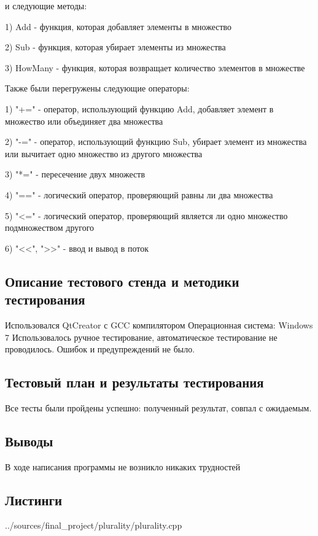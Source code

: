 \documentclass[12pt,a4paper]{report}
\begin{document}
и следующие методы:
\item[1)] Add - функция, которая добавляет элементы в множество
\item[2)] Sub - функция, которая убирает элементы из множества
\item[3)] HowMany - функция, которая возвращает количество элементов в множестве

Также были перегружены следующие операторы:
\item[1)] "+=" - оператор, использующий функцию Add, добавляет элемент в множество или объединяет два множества
\item[2)] "-=" - оператор, использующий функцию Sub, убирает элемент из множества или вычитает одно множество из другого множества
\item[3)] "*=" - пересечение двух множеств
\item[4)] "==" - логический оператор, проверяющий равны ли два множества
\item[5)] "<=" - логический оператор, проверяющий является ли одно множество подмножеством другого
\item[6)] "<<", ">>" - ввод и вывод в поток

\subsection{Описание тестового стенда и методики тестирования}
Использовался QtCreator с GCC компилятором
Операционная система: Windows 7
Использовалось ручное тестирование, автоматическое тестирование
не проводилось. Ошибок и предупреждений не было.
\subsection{Тестовый план и результаты тестирования}
Все тесты были пройдены успешно: полученный результат, совпал с ожидаемым.
\subsection{Выводы}
В ходе написания программы не возникло никаких трудностей
\subsection*{Листинги}

{../sources/final_project/plurality/plurality.cpp}
\end{document}
